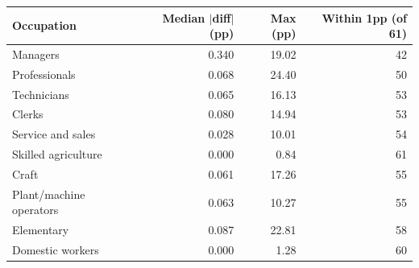 \begin{tabular}{lrrr}
\toprule
Occupation & Median $|$diff$|$ (pp) & Max (pp) & Within 1pp (of 61) \\
\midrule
Managers & 0.340 & 19.02 & 42 \\
Professionals & 0.068 & 24.40 & 50 \\
Technicians & 0.065 & 16.13 & 53 \\
Clerks & 0.080 & 14.94 & 53 \\
Service and sales & 0.028 & 10.01 & 54 \\
Skilled agriculture & 0.000 & 0.84 & 61 \\
Craft & 0.061 & 17.26 & 55 \\
Plant/machine operators & 0.063 & 10.27 & 55 \\
Elementary & 0.087 & 22.81 & 58 \\
Domestic workers & 0.000 & 1.28 & 60 \\
\bottomrule
\end{tabular}
